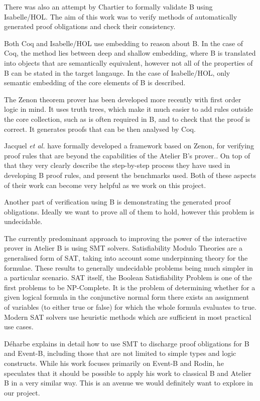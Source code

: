 \documentclass[11pt,journal]{IEEEtran}
\begin{document}
	There was also an attempt by Chartier to formally validate B using Isabelle/HOL\cite{Isabelle}. The aim of this work was to verify methods of automatically generated proof obligations and check their consistency.
		
	Both Coq and Isabelle/HOL use embedding to reason about B. In the case of Coq, the method lies between deep and shallow embedding, where B is translated into objects that are semantically equivalent, however not all of the properties of B can be stated in the target langauge\cite{Coq and PVS}. In the case of Isabelle/HOL, only semantic embedding of the core elements of B is described.
	
	The Zenon theorem prover has been developed more recently with first order logic in mind\cite{Zenon}. It uses truth trees, which make it much easier to add rules outside the core collection, such as is often required in B, and to check that the proof is correct. It generates proofs that can be then analysed by Coq.
	
	Jacquel \emph{et al.} have formally developed a framework based on Zenon, for verifying proof rules that are beyond the capabilities of the Atelier B's prover.\cite{embedding and theorem proving}. On top of that they very clearly describe the step-by-step process they have used in developing B proof rules, and present the benchmarks used. Both of these aspects of their work can become very helpful as we work on this project.
	
	Another part of verification using B is demonstrating the generated proof obligations. Ideally we want to prove all of them to hold, however this problem is undecidable.
	
	The currently predominant approach to improving the power of the interactive prover in Atelier B is using SMT solvers. Satisfiability Modulo Theories are a generalised form of SAT, taking into account some underpinning theory for the formulae.  These results to generally undecidable problems being much simpler in a particular scenario.\cite{SMT handbook} SAT itself, the Boolean Satisfiability Problem is one of the first problems to be NP-Complete. It is the problem of determining whether for a given logical formula in the  conjunctive normal form there exists an assignment of variables (to either true or false) for which the whole formula evaluates to true. Modern SAT solvers use heuristic methods which are sufficient in most practical use cases\cite{SAT}.
	
	D\'{e}harbe explains in detail how to use SMT to discharge proof obligations for B and Event-B, including those that are not limited to simple types and logic constructs. While his work focuses primarily on Event-B and Rodin, he speculates that it should be possible to apply his work to classical B and Atelier B in a very similar way.\cite{SMT} This is an avenue we would definitely want to explore in our project.
	
\end{document}
